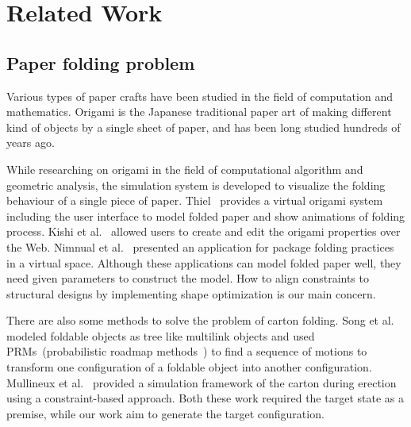 \section{Related Work}\label{sec:relatedwork}
\subsection{Paper folding problem}
Various types of paper crafts have been studied in the field of computation and mathematics. Origami is the Japanese traditional paper art of making different kind of objects by a single sheet of paper, and has been long studied hundreds of years ago\cite{KANADE1980279}.

While researching on origami in the field of computational algorithm and geometric analysis, the simulation system is developed to visualize the folding behaviour of a single piece of paper. Thiel~\cite{Thiel1998} provides a virtual origami system including the user interface to model folded paper and show animations of folding process. Kishi et al.~\cite{Kishi:1998:OFP:786112.786279} allowed users to create and edit the origami properties over the Web. Nimnual et al.~\cite{Nimnual2007Virtual} presented an application for package folding practices in a virtual space. Although these applications can model folded paper well, they need given parameters to construct the model. How to align constraints to structural designs by implementing shape optimization is our main concern.

There are also some methods to solve the problem of carton folding. 
Song et al.~\cite{Song:2000:MPA:892954} modeled foldable objects as tree like multilink objects and used PRMs~(probabilistic roadmap methods~\cite{Kavraki:1994:PRP:891758}) to find a sequence of motions to transform one configuration of a foldable object into another configuration. 
Mullineux et al.~\cite{Mullineux:2010:CSC:1739328.1739673} provided a simulation framework of the carton during erection using a constraint-based approach. Both these work required the target state as a premise, while our work aim to generate the target configuration.

